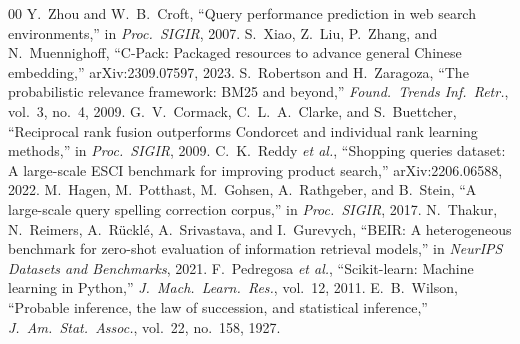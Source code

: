\documentclass[conference]{IEEEtran}
\begin{document}
\begin{thebibliography}{00}
 Y.~Zhou and W.~B.~Croft, ``Query performance prediction in web search environments,'' in \emph{Proc.\ SIGIR}, 2007.
 S.~Xiao, Z.~Liu, P.~Zhang, and N.~Muennighoff, ``C-Pack: Packaged resources to advance general Chinese embedding,'' arXiv:2309.07597, 2023.
 S.~Robertson and H.~Zaragoza, ``The probabilistic relevance framework: BM25 and beyond,'' \emph{Found.\ Trends Inf.\ Retr.}, vol.~3, no.~4, 2009.
 G.~V.~Cormack, C.~L.~A.~Clarke, and S.~Buettcher, ``Reciprocal rank fusion outperforms Condorcet and individual rank learning methods,'' in \emph{Proc.\ SIGIR}, 2009.
 C.~K.~Reddy \emph{et al.}, ``Shopping queries dataset: A large-scale ESCI benchmark for improving product search,'' arXiv:2206.06588, 2022.
 M.~Hagen, M.~Potthast, M.~Gohsen, A.~Rathgeber, and B.~Stein, ``A large-scale query spelling correction corpus,'' in \emph{Proc.\ SIGIR}, 2017.
 N.~Thakur, N.~Reimers, A.~R\"uckl\'e, A.~Srivastava, and I.~Gurevych, ``BEIR: A heterogeneous benchmark for zero-shot evaluation of information retrieval models,'' in \emph{NeurIPS Datasets and Benchmarks}, 2021.
 F.~Pedregosa \emph{et al.}, ``Scikit-learn: Machine learning in Python,'' \emph{J.\ Mach.\ Learn.\ Res.}, vol.~12, 2011.
 E.~B.~Wilson, ``Probable inference, the law of succession, and statistical inference,'' \emph{J.\ Am.\ Stat.\ Assoc.}, vol.~22, no.~158, 1927.
\end{thebibliography}
\end{document}
